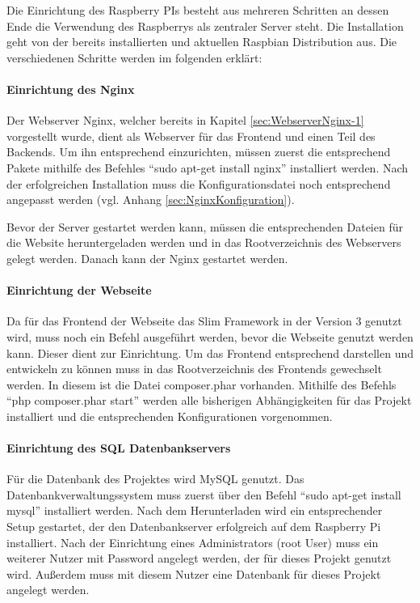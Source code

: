 Die Einrichtung des Raspberry PIs besteht aus mehreren Schritten an dessen Ende die Verwendung des Raspberrys als zentraler Server steht. Die Installation geht von der bereits installierten und aktuellen Raspbian Distribution aus. Die verschiedenen Schritte werden im folgenden erklärt: 
\paragraph{Einrichtung des Nginx} $\;$ \\ 
\label{sec:Einrichtung des Nginx-1} 
Der Webserver Nginx, welcher bereits in Kapitel \ref{sec:WebserverNginx-1} vorgestellt wurde, dient als Webserver für das Frontend und einen Teil des Backends. Um ihn entsprechend einzurichten, müssen zuerst die entsprechend Pakete mithilfe des Befehles ``sudo apt-get install nginx'' installiert werden. Nach der erfolgreichen Installation muss die Konfigurationsdatei noch entsprechend angepasst werden (vgl. Anhang \ref {sec:NginxKonfiguration}). 

Bevor der Server gestartet werden kann, müssen die entsprechenden Dateien für die Website heruntergeladen werden und in das Rootverzeichnis des Webservers gelegt werden. Danach kann der Nginx gestartet werden. 

\paragraph{Einrichtung der Webseite} $\;$ \\ 
\label{sec:EinrichtungderWebseite} 
Da für das Frontend der Webseite das Slim Framework in der Version 3 genutzt wird, muss noch ein Befehl ausgeführt werden, bevor die Webseite genutzt werden kann. Dieser dient zur Einrichtung. Um das Frontend entsprechend darstellen und entwickeln zu können muss in das Rootverzeichnis des Frontends gewechselt werden. In diesem ist die Datei composer.phar vorhanden. Mithilfe des Befehls ``php composer.phar start'' werden alle bisherigen Abhängigkeiten für das Projekt installiert und die entsprechenden Konfigurationen vorgenommen.

\paragraph{Einrichtung des SQL Datenbankservers}$\;$ \\
\label{sec:Einrichtung des SQL Datenbankservers-1} 
Für die Datenbank des Projektes wird MySQL genutzt. Das Datenbankverwaltungssystem muss zuerst über den Befehl ``sudo apt-get install mysql'' installiert werden. Nach dem Herunterladen wird ein entsprechender Setup gestartet, der den Datenbankserver erfolgreich auf dem Raspberry Pi installiert. Nach der Einrichtung eines Administrators (root User) muss ein weiterer Nutzer mit Password angelegt werden, der für dieses Projekt genutzt wird. Außerdem muss mit diesem Nutzer eine Datenbank für dieses Projekt angelegt werden.


